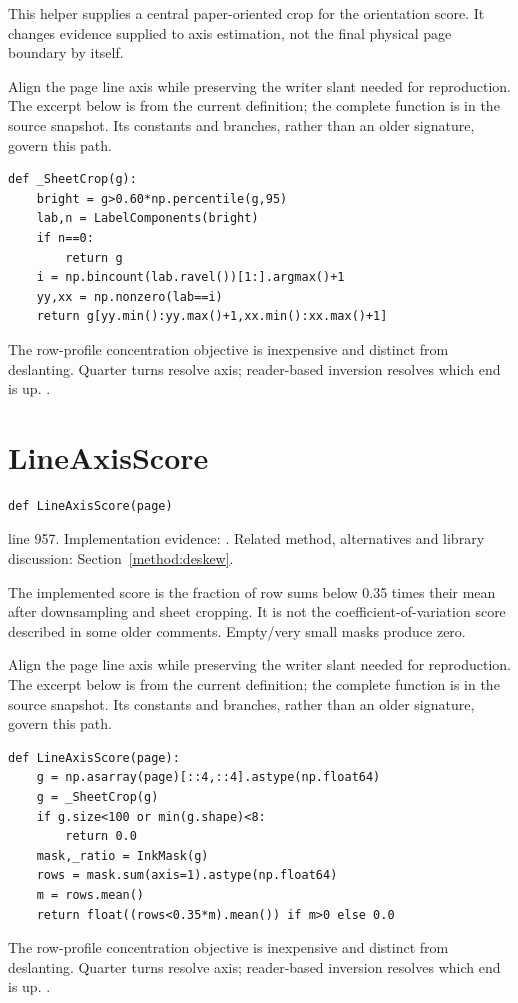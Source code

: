 This helper supplies a central paper-oriented crop for the orientation score. It changes evidence supplied to axis estimation, not the final physical page boundary by itself.


Align the page line axis while preserving the writer slant needed for reproduction. The excerpt below is from the current definition; the complete function is in the source snapshot. Its constants and branches, rather than an older signature, govern this path.


\begin{lstlisting}[style=plain]
def _SheetCrop(g):
    bright = g>0.60*np.percentile(g,95)
    lab,n = LabelComponents(bright)
    if n==0:
        return g
    i = np.bincount(lab.ravel())[1:].argmax()+1
    yy,xx = np.nonzero(lab==i)
    return g[yy.min():yy.max()+1,xx.min():xx.max()+1]
\end{lstlisting}
The row-profile concentration objective is inexpensive and distinct from deslanting. Quarter turns resolve axis; reader-based inversion resolves which end is up. \cite{postl1986,wolberg1990,opencvtransform,pillowops}.


\section{LineAxisScore}\label{fn:segment:LineAxisScore}
\begin{lstlisting}[style=sig]
def LineAxisScore(page)
\end{lstlisting}
 line 957. Implementation evidence: \cite{code2026}. Related method, alternatives and library discussion: Section~\ref{method:deskew}.


The implemented score is the fraction of row sums below 0.35 times their mean after downsampling and sheet cropping. It is not the coefficient-of-variation score described in some older comments. Empty/very small masks produce zero.


Align the page line axis while preserving the writer slant needed for reproduction. The excerpt below is from the current definition; the complete function is in the source snapshot. Its constants and branches, rather than an older signature, govern this path.


\begin{lstlisting}[style=plain]
def LineAxisScore(page):
    g = np.asarray(page)[::4,::4].astype(np.float64)
    g = _SheetCrop(g)
    if g.size<100 or min(g.shape)<8:
        return 0.0
    mask,_ratio = InkMask(g)
    rows = mask.sum(axis=1).astype(np.float64)
    m = rows.mean()
    return float((rows<0.35*m).mean()) if m>0 else 0.0
\end{lstlisting}
The row-profile concentration objective is inexpensive and distinct from deslanting. Quarter turns resolve axis; reader-based inversion resolves which end is up. \cite{postl1986,wolberg1990,opencvtransform,pillowops}.


